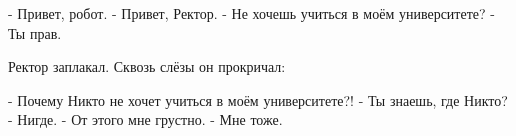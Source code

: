 - Привет, робот.
- Привет, Ректор.
- Не хочешь учиться в моём университете?
- Ты прав.

Ректор заплакал. Сквозь слёзы он прокричал:

- Почему Никто не хочет учиться в моём университете?!
- Ты знаешь, где Никто?
- Нигде.
- От этого мне грустно.
- Мне тоже.